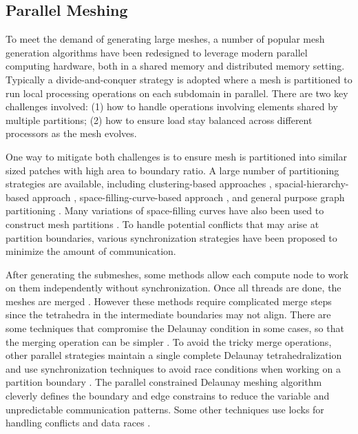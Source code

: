 \subsection{Parallel Meshing}

To meet the demand of generating large meshes,
a number of popular mesh generation algorithms have been redesigned to
leverage modern parallel computing hardware, both in a shared memory and distributed memory setting. Typically a divide-and-conquer strategy is adopted where a mesh is partitioned to run local processing operations
on each subdomain in parallel.  There are two key challenges involved: (1) how to
handle operations involving elements shared by multiple partitions; (2) how to
ensure load stay balanced across different processors as the mesh evolves.

One way to mitigate both challenges is to ensure mesh is partitioned into
similar sized patches with high area to boundary ratio.
A large number of partitioning strategies are available, including
clustering-based approaches \cite{Mahmoud2021}, spacial-hierarchy-based approach
\cite{loseille2017unique,lo2012parallel}, space-filling-curve-based approach
\cite{marot2019one,borrell2018parallel}, and general purpose graph partitioning \cite{karypis1998fast}. Many variations of space-filling curves have also been used to construct mesh partitions \cite{chrisochoides2006parallel, aluru1997parallel}.
%
To handle potential conflicts that may arise at partition boundaries,
various synchronization strategies have been proposed
\cite{okusanya1996parallel,chrisochoides2003parallel,chrisochoides2006parallel} to minimize the amount of
communication.
%

After generating the submeshes, some methods allow each compute node to work on them independently without synchronization. Once all threads are done, the meshes are merged \cite{Cignoni1993, chen2010merge, funke2017parallel, blelloch1999design}. However these methods require complicated merge steps since the tetrahedra in the intermediate boundaries may not align. There are some techniques that compromise the Delaunay condition in some cases, so that the merging operation can be simpler \cite{lachat2014parallel}. 
%
To avoid the tricky merge operations, other parallel strategies maintain a single complete Delaunay tetrahedralization and use synchronization techniques to avoid race conditions when working on a partition boundary \cite{okusanya19973, chrisochoides2003parallel}. The parallel constrained Delaunay meshing algorithm \cite{chew1997parallel} cleverly defines the boundary and edge constrains to reduce the variable and unpredictable communication patterns. Some other techniques use locks for handling conflicts and data races \cite{blandford2006engineering, batista2010parallel, foteinos2011dynamic}. 
%

